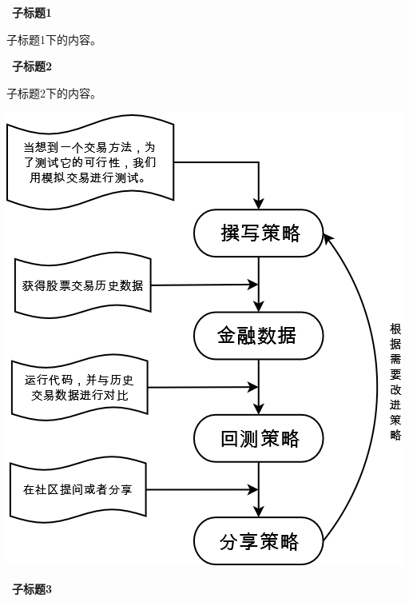 \documentclass[a4paper, 12pt]{ctexart}
\begin{document}
\hspace{-2em}\HandRight\, \textbf{子标题1}

子标题1下的内容。

\hspace{-2em}\HandRight\, \textbf{子标题2}

子标题2下的内容。

\vspace{3ex}
\centerline{\includegraphics[scale=0.2]{fc.png}}  

\hspace{-2em}\HandRight\, \textbf{子标题3}
\end{document}
